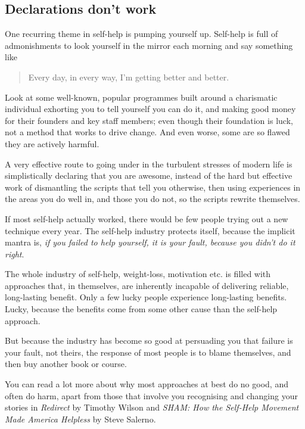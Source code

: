 \subsection{Declarations don't work}
One recurring theme in self-help is pumping yourself up. Self-help is full of admonishments to look yourself in the mirror each morning and say something like \begin{quote}Every day, in every way, I'm getting better and better.\end{quote} 


Look at some well-known, popular programmes built around a charismatic individual exhorting you to tell yourself you can do it, and making good money for their founders and key staff members; even though their foundation is luck, not a method that works\cite{wilson-redirect} to drive change. And even worse, some are so flawed they are actively harmful. 


A very effective route to going under in the turbulent stresses of modern life is simplistically declaring that you are awesome, instead of the hard but effective work of dismantling the scripts that tell you otherwise, then using experiences in the areas you do well in, and those you do not, so the scripts rewrite themselves. 


If most self-help actually worked, there would be few people trying out a new technique every year. The self-help industry protects itself, because the implicit mantra is, \emph{if you failed to help yourself, it is your fault, because you didn’t do it right}. 


The whole industry of self-help, weight-loss, motivation etc. is filled with approaches that, in themselves, are inherently incapable of delivering reliable, long-lasting benefit. Only a few lucky people experience long-lasting benefits. Lucky, because the benefits come from some other cause than the self-help approach. 


But because the industry has become so good at persuading you that failure is your fault, not theirs, the response of most people is to blame themselves, and then buy another book or course. 


You can read a lot more about why most approaches at best do no good, and often do harm, apart from those that involve you recognising and changing your stories in \emph{Redirect} by Timothy Wilson\cite{wilson-redirect}  and \emph{SHAM: How the Self-Help Movement Made America Helpless} by Steve Salerno\cite{salerno-sham}.


